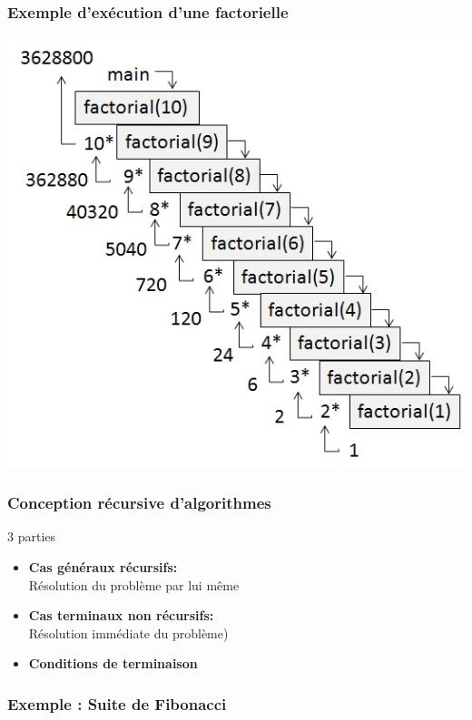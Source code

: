 \documentclass[table,handout,tikz,12pt,svgnames]{beamer}
\begin{document}
\begin{frame}[fragile=singleslide]
	\frametitle{Exemple d'exécution d'une factorielle}
	{\includegraphics[scale=0.50]{../common-images/RecursiveFactorial.jpg}}
\end{frame}

\begin{frame}[fragile=singleslide]
	\frametitle{Conception récursive d'algorithmes}
	\begin{block}{3 parties} %
		\begin{itemize}
			\item \textbf{Cas généraux récursifs:} \\ Résolution du problème par lui même
			\item \textbf{Cas terminaux non récursifs:} \\ Résolution immédiate du problème)
			\item \textbf{Conditions de terminaison} 
		\end{itemize}
	\end{block}
\end{frame}

\begin{frame}[fragile=singleslide]
	\frametitle{Exemple : Suite de Fibonacci}
	\begin{verbatim}
	\end{verbatim}
\end{frame}
\end{document}
